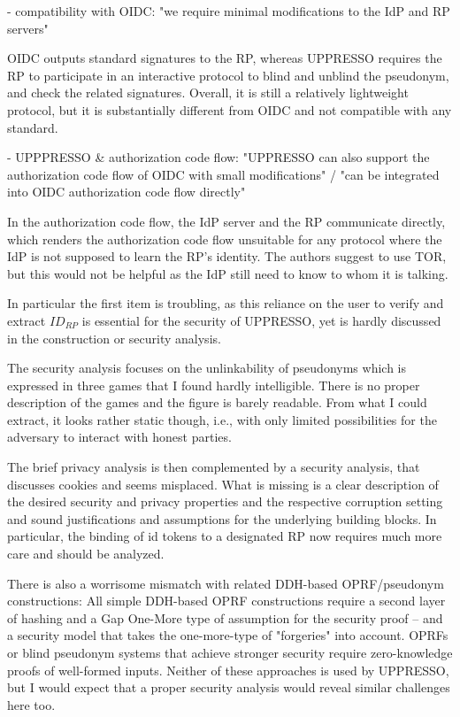 \documentclass[letterpaper,onecolumn,10pt]{article}
\begin{document}
- compatibility with OIDC: "we require minimal modifications to the IdP and RP servers"

OIDC outputs standard signatures to the RP, whereas UPPRESSO requires the RP to participate in an interactive protocol to blind and unblind the pseudonym, and check the related signatures. Overall, it is still a relatively lightweight protocol, but it is substantially different from OIDC and not compatible with any standard.  

- UPPPRESSO \& authorization code flow: "UPPRESSO can also support the authorization code flow of
OIDC with small modifications" / "can be integrated into OIDC authorization code flow directly"

In the authorization code flow, the IdP server and the RP communicate directly, which renders the authorization code flow unsuitable for any protocol where the IdP is not supposed to learn the RP's identity. The authors suggest to use TOR, but this would not be helpful as the IdP still need to know to whom it is talking.


In particular the first item is troubling, as this reliance on the user to verify and extract $ID_{RP}$ is essential for the security of UPPRESSO, yet is hardly discussed in the construction or security analysis.

The security analysis focuses on the unlinkability of pseudonyms which is expressed in three games that I found hardly intelligible. There is no proper description of the games and the figure is barely readable. From what I could extract, it looks rather static though, i.e., with only limited possibilities for the adversary to interact with honest parties. 

The brief privacy analysis is then complemented by a security analysis, that discusses cookies and seems misplaced. 
What is missing is a clear description of the desired security and privacy properties and the respective corruption setting and sound justifications and assumptions for the underlying building blocks. In particular, the binding of id tokens to a designated RP now requires much more care and should be analyzed.

There is also a worrisome mismatch with related DDH-based OPRF/pseudonym constructions: All simple DDH-based OPRF constructions require a second layer of hashing and a Gap One-More type of assumption for the security proof -- and a security model that takes the one-more-type of "forgeries" into account. OPRFs or blind pseudonym systems that achieve stronger security require zero-knowledge proofs of well-formed inputs. Neither of these approaches is used by UPPRESSO, but I would expect that a proper security analysis would reveal similar challenges here too.
\end{document}
